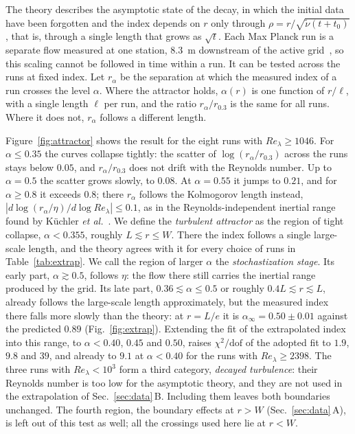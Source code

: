 \documentclass[floatfix,aps,pre,preprint,superscriptaddress,nofootinbib,amsmath,amssymb]{revtex4-2}
\begin{document}
The theory describes the asymptotic state of the decay, in which the initial data have been forgotten and the index depends
on $r$ only through $\rho=r/\sqrt{\tilde\nu(t+t_0)}$, that is, through a single length that grows as $\sqrt t$. Each Max
Planck run is a separate flow measured at one station, $8.3$~m downstream of the active grid~\cite{GregXi2}, so this scaling
cannot be followed in time within a run. It can be tested across the runs at fixed index. Let $r_\alpha$ be the separation
at which the measured index of a run crosses the level $\alpha$. Where the attractor holds, $\alpha(r)$ is one function of
$r/\ell$, with a single length $\ell$ per run, and the ratio $r_\alpha/r_{0.3}$ is the same for all runs. Where it does not,
$r_\alpha$ follows a different length.

Figure~\ref{fig:attractor} shows the result for the eight runs with $Re_\lambda\ge1046$. For $\alpha\le0.35$ the curves
collapse tightly: the scatter of $\log(r_\alpha/r_{0.3})$ across the runs stays below $0.05$, and $r_\alpha/r_{0.3}$ does not
drift with the Reynolds number. Up to $\alpha=0.5$ the scatter grows slowly, to $0.08$. At $\alpha=0.55$ it jumps to $0.21$,
and for $\alpha\ge0.8$ it exceeds $0.8$; there $r_\alpha$ follows the Kolmogorov length instead,
$|d\log(r_\alpha/\eta)/d\log Re_\lambda|\le0.1$, as in the Reynolds-independent inertial range found by Küchler
\emph{et al.}~\cite{GregXi2}. We define the \emph{turbulent attractor} as the region of tight collapse, $\alpha<0.355$, roughly
$L\lesssim r\le W$. There the index follows a single large-scale length, and the theory agrees with it for every choice of runs in
Table~\ref{tab:extrap}. We call the region of larger $\alpha$ the \emph{stochastization stage}. Its early part, $\alpha\gtrsim0.5$,
follows $\eta$: the flow there still carries the inertial range produced by the grid. Its late part, $0.36\lesssim\alpha\le0.5$
or roughly $0.4L\lesssim r\lesssim L$, already follows the large-scale length approximately, but the measured index there falls
more slowly than the theory: at $r=L/e$ it is $\alpha_\infty=0.50\pm0.01$ against the predicted $0.89$ (Fig.~\ref{fig:extrap}).
Extending the fit of the extrapolated index into this range, to $\alpha<0.40$, $0.45$ and $0.50$, raises $\chi^2/\mathrm{dof}$
of the adopted fit to $1.9$, $9.8$ and $39$, and already to $9.1$ at $\alpha<0.40$ for the runs with $Re_\lambda\ge2398$. The
three runs with $Re_\lambda<10^3$ form a third category, \emph{decayed turbulence}: their Reynolds number is too low for the
asymptotic theory, and they are not used in the extrapolation of Sec.~\ref{sec:data}\,B. Including them leaves both boundaries
unchanged. The fourth region, the boundary effects at $r>W$ (Sec.~\ref{sec:data}\,A), is left out of this test as well; all
the crossings used here lie at $r<W$.
\end{document}
